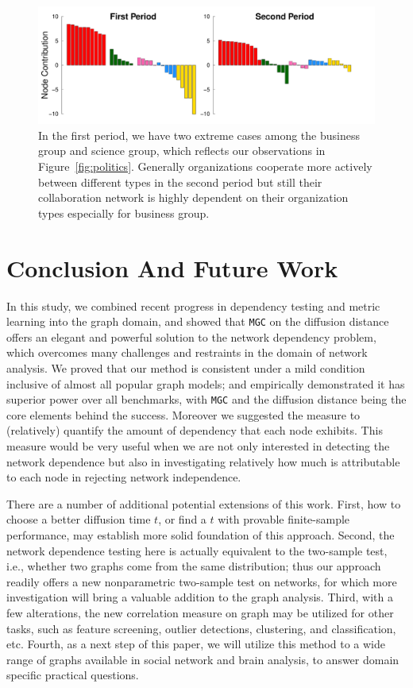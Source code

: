 \documentclass[11pt]{article}
\theoremstyle{definition}
\begin{document}
\begin{figure}[h]
	\centering
	\includegraphics[width=\linewidth]{../Figure/barplots_nolegend.pdf}	
	\caption{In the first period, we have two extreme cases among the business group and science group, which reflects our observations in Figure~\ref{fig:politics}. Generally organizations cooperate more actively between different types in the second period but still their collaboration network is highly dependent on their organization types especially for business group.}
	\label{fig:barplots}
\end{figure}

\vspace*{-0.5cm}
\section{Conclusion And Future Work}
\label{sec:conc}
	\vspace*{-0.2cm}
In this study, we combined recent progress in dependency testing and metric learning into the graph domain, and showed that \texttt{MGC} on the diffusion distance offers an elegant and powerful solution to the network dependency problem, which overcomes many challenges and restraints in the domain of network analysis. We proved that our method is consistent under a mild condition inclusive of almost all popular graph models; and empirically demonstrated it has superior power over all benchmarks, with \texttt{MGC} and the diffusion distance being the core elements behind the success. Moreover we suggested the measure to (relatively) quantify the amount of dependency that each node exhibits. This measure would be very useful when we are not only interested in detecting the network dependence but also in investigating relatively how much is attributable to each node in rejecting network independence.  

There are a number of additional potential extensions of this work. First, how to choose a better diffusion time $t$, or find a $t$ with provable finite-sample performance, may establish more solid foundation of this approach. Second, the network dependence testing here is actually equivalent to the two-sample test, i.e., whether two graphs come from the same distribution; thus our approach readily offers a new nonparametric two-sample test on networks, for which more investigation will bring a valuable addition to the graph analysis. Third, with a few alterations, the new correlation measure on graph may be utilized for other tasks, such as feature screening, outlier detections, clustering, and classification, etc. Fourth, as a next step of this paper, we will utilize this method to a wide range of graphs available in social network and brain analysis, to answer domain specific practical questions.
\end{document}
